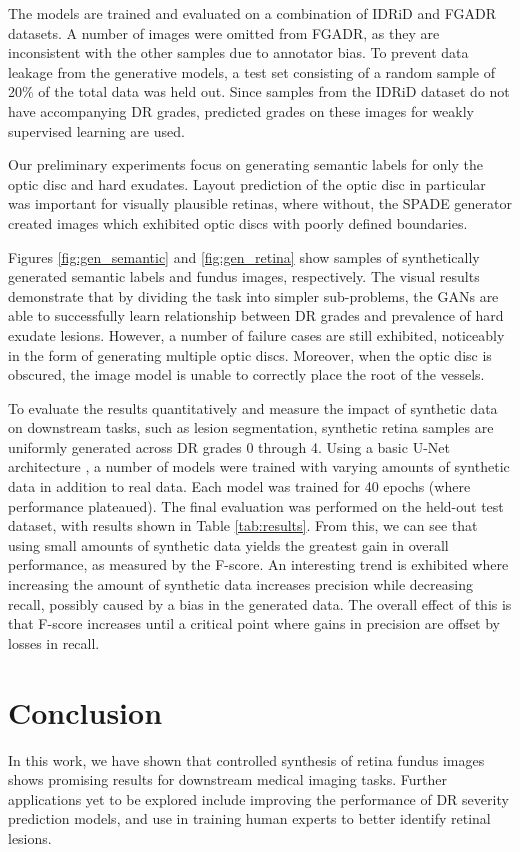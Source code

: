 \documentclass{midl} %
\begin{document}
The models are trained and evaluated on a combination of IDRiD \cite{Porwal2018} and FGADR \cite{Zhou2020b} datasets.
A number of images were omitted from FGADR, as they are inconsistent with the other samples due to annotator bias.
To prevent data leakage from the generative models, a test set consisting of a random sample of 20\% of the total data was held out.
Since samples from the IDRiD dataset do not have accompanying DR grades, predicted grades on these images for weakly supervised learning are used.

Our preliminary experiments focus on generating semantic labels for only the optic disc and hard exudates.
Layout prediction of the optic disc in particular was important for visually plausible retinas, where without, the SPADE generator created images which exhibited optic discs with poorly defined boundaries. 

Figures \ref{fig:gen_semantic} and \ref{fig:gen_retina} show samples of synthetically generated semantic labels and fundus images, respectively. The visual results demonstrate that by dividing the task into simpler sub-problems, the GANs are able to successfully learn relationship between DR grades and prevalence of hard exudate lesions.
However, a number of failure cases are still exhibited, noticeably in the form of generating multiple optic discs. Moreover, when the optic disc is obscured, the image model is unable to correctly place the root of the vessels. 

To evaluate the results quantitatively and measure the impact of synthetic data on downstream tasks, such as lesion segmentation, synthetic retina samples are uniformly generated across DR grades 0 through 4.
Using a basic U-Net architecture \cite{ronneberger2015unet}, a number of models were trained with varying amounts of synthetic data in addition to real data.
Each model was trained for 40 epochs (where performance plateaued).
The final evaluation was performed on the held-out test dataset, with results shown in Table \ref{tab:results}. 
From this, we can see that using small amounts of synthetic data yields the greatest gain in overall performance, as measured by the F-score.
An interesting trend is exhibited where increasing the amount of synthetic data increases precision while decreasing recall, possibly caused by a bias in the generated data.
The overall effect of this is that F-score increases until a critical point where gains in precision are offset by losses in recall.

\section{Conclusion}

In this work, we have shown that controlled synthesis of retina fundus images shows promising results for downstream medical imaging tasks.
Further applications yet to be explored include improving the performance of DR severity prediction models, and use in training human experts to better identify retinal lesions.


\end{document}
